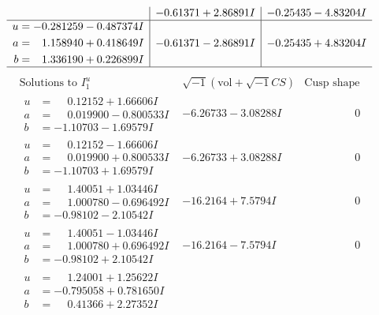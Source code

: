 \documentclass[1p]{elsarticle_modified}
\theoremstyle{definition}
\newcommand{\I}{\sqrt{-1}}
\begin{document}
$$\begin{array}{c|c|c}
 & -0.61371 + 2.86891 I & -0.25435 - 4.83204 I \\ \hline\begin{aligned}
u &= -0.281259 - 0.487374 I \\
a &= \phantom{-}1.158940 + 0.418649 I \\
b &= \phantom{-}1.336190 + 0.226899 I\end{aligned}
 & -0.61371 - 2.86891 I & -0.25435 + 4.83204 I\\
 \hline 
 \end{array}$$\newpage$$\begin{array}{c|c|c}  
\text{Solutions to }I^u_{1}& \I (\text{vol} + \sqrt{-1}CS) & \text{Cusp shape}\\
 \hline 
\begin{aligned}
u &= \phantom{-}0.12152 + 1.66606 I \\
a &= \phantom{-}0.019900 - 0.800533 I \\
b &= -1.10703 - 1.69579 I\end{aligned}
 & -6.26733 - 3.08288 I & \phantom{-0.000000 } 0 \\ \hline\begin{aligned}
u &= \phantom{-}0.12152 - 1.66606 I \\
a &= \phantom{-}0.019900 + 0.800533 I \\
b &= -1.10703 + 1.69579 I\end{aligned}
 & -6.26733 + 3.08288 I & \phantom{-0.000000 } 0 \\ \hline\begin{aligned}
u &= \phantom{-}1.40051 + 1.03446 I \\
a &= \phantom{-}1.000780 - 0.696492 I \\
b &= -0.98102 - 2.10542 I\end{aligned}
 & -16.2164 + 7.5794 I & \phantom{-0.000000 } 0 \\ \hline\begin{aligned}
u &= \phantom{-}1.40051 - 1.03446 I \\
a &= \phantom{-}1.000780 + 0.696492 I \\
b &= -0.98102 + 2.10542 I\end{aligned}
 & -16.2164 - 7.5794 I & \phantom{-0.000000 } 0 \\ \hline\begin{aligned}
u &= \phantom{-}1.24001 + 1.25622 I \\
a &= -0.795058 + 0.781650 I \\
b &= \phantom{-}0.41366 + 2.27352 I\end{aligned}

\end{array}$$
\end{document}
